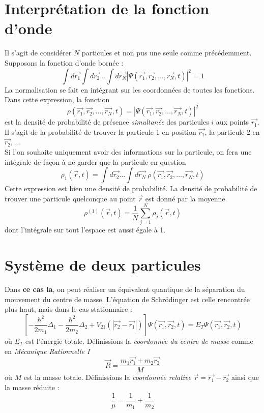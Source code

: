 \documentclass	[11pt, a4paper, openany]{book}
\begin{document}
	
	\section{Interprétation de la fonction d'onde}
	Il s'agit de considérer $N$ particules et non pus une seule comme précédemment. Supposons la fonction d'onde bornée :
	\begin{equation}
		\int d\vec{r_1}\int d\vec{r_2}\dots\int d\vec{r_N}|\Psi(\vec{r_1}, \vec{r_2}, \dots, \vec{r_N}, t)|^2 = 1
	\end{equation}
	La normalisation se fait en intégrant sur les coordonnées de toutes les fonctions. Dans cette expression, la fonction 
	\begin{equation}
		\rho(\vec{r_1}, \vec{r_2}, \dots, \vec{r_N}, t)=|\Psi(\vec{r_1}, \vec{r_2}, \dots, \vec{r_N}, t)|^2
	\end{equation}
	est la densité de probabilité de présence \textit{simultanée} des particules $i$ aux points $\vec{r_1}$. Il s'agit de la probabilité de trouver la particule 1 en position $\vec{r_1}$, la particule 2 en $\vec{r_2}$, ...\\
	Si l'on souhaite uniquement avoir des informations sur la particule, on fera une intégrale de façon à ne garder que la particule en question
	\begin{equation}
		\rho_1(\vec{r},t) = \int d\vec{r_2}\dots\int d\vec{r_N}\ \rho(\vec{r_1}, \vec{r_2}, \dots, \vec{r_N}, t)
	\end{equation}
	Cette expression est bien une densité de probabilité. La densité de probabilité de trouver une particule quelconque au point $\vec{r}$ est donné par la moyenne
	\begin{equation}
		\rho^{(1)}(\vec{r},t) = \frac{1}{N}\sum_{j=1}^N \rho_j(\vec{r},t)
	\end{equation}
	dont l'intégrale sur tout l'espace est aussi égale à 1.
	
	\section{Système de deux particules}
	Dans \textbf{ce cas la}, on peut réaliser un équivalent quantique de la séparation du mouvement du centre de masse. L'équation de Schrödinger est celle rencontrée plus haut, mais dans le cas stationnaire :
	\begin{equation}
		\left[-\frac{\hbar^2}{2m_1}\Delta_1 - \frac{\hbar^2}{2m_2}\Delta_2 + V_{21}(|\vec{r_2}-\vec{r_1}|) \right]\Psi(\vec{r_1}, \vec{r_2},t) = E_T \Psi(\vec{r_1}, \vec{r_2},t)
	\end{equation}
	où $E_T$ est l'énergie totale. Définissions la \textit{coordonnée du centre de masse} comme en \textit{Mécanique Rationnelle I}
	\begin{equation}
		\vec{R} = \frac{m_1\vec{r_1}+m_2\vec{r_2}}{M}
	\end{equation}
	où $M$ est la masse totale. Définissions la \textit{coordonnée relative} $\vec{r} = \vec{r_1}-\vec{r_2}$ ainsi que la masse réduite :
	\begin{equation}
		\frac{1}{\mu} = \frac{1}{m_1}+\frac{1}{m_2}
	\end{equation}
	
\end{document}
